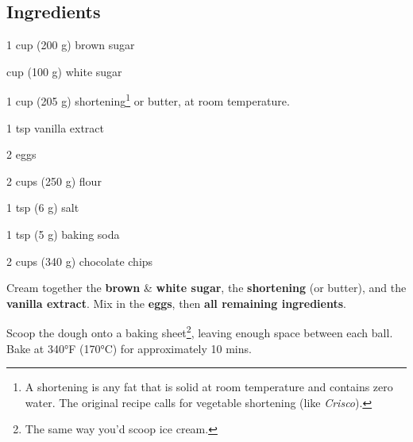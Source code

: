 \newpage
{}

\subsection*{Ingredients}
\begin{ingredients}
	\item 1 cup (200 g) brown sugar
	\item {} cup (100 g) white sugar
	\item 1 cup (205 g) shortening\footnote{A shortening is any fat that is solid at room temperature and contains zero water. The original recipe calls for vegetable shortening (like \textit{Crisco}).} or butter, at room temperature.
	\item 1 tsp vanilla extract
	\item 2 eggs
	\item 2 cups (250 g) flour
	\item 1 tsp (6 g) salt
	\item 1 tsp (5 g) baking soda
	\item 2 cups (340 g) chocolate chips
\end{ingredients}

\medskip

Cream together the \textbf{brown} \& \textbf{white sugar}, the \textbf{shortening} (or butter), and the \textbf{vanilla extract}.
Mix in the \textbf{eggs}, then \textbf{all remaining ingredients}.

Scoop the dough onto a baking sheet\footnote{The same way you'd scoop ice cream.}, leaving enough space between each ball.
Bake at 340°F (170°C) for approximately 10 mins.

\vspace*{0.75 cm}

\begin{recipeblock}
	\noindent
\end{recipeblock}